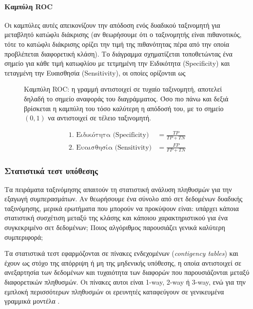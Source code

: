 \paragraph{Καμπύλη ROC} Οι καμπύλες αυτές απεικονίζουν την απόδοση ενός δυαδικού ταξινομητή για μεταβλητό κατώφλι διάκρισης (αν θεωρήσουμε ότι ο ταξινομητής είναι πιθανοτικός, τότε το κατώφλι διάκρισης ορίζει την τιμή της πιθανότητας πέρα από την οποία προβλέπεται διαφορετική κλάση). Το διάγραμμα σχηματίζεται τοποθετώντας ένα σημείο για κάθε τιμή κατωφλίου με τετμημένη την Ειδικότητα (Specificity) και τεταγμένη την Ευαισθησία (Sensitivity), οι οποίες ορίζονται ως

\begin{figure}[!htb]
	\centering
	\scalebox{0.5}{
     }
     \caption[Καμπύλη ROC Δυαδικού Ταξινομητή]{Καμπύλη ROC: η γραμμή αντιστοιχεί σε τυχαίο ταξινομητή, αποτελεί δηλαδή το σημείο αναφοράς του διαγράμματος. Όσο πιο πάνω και δεξιά βρίσκεται η καμπύλη του τόσο καλύτερη η απόδοσή του, με το σημείο $(0,1)$ να αντιστοιχεί σε τέλειο ταξινομητή.}
\end{figure}

\begin{align*} 
\text{1. Ειδικότητα (Specificity)} &= \frac{TP}{T P + T N} \\ 	
\text{2. Ευαισθησία (Sensitivity)} &= \frac{FP}{FP + TN} 
\end{align*}

	 
\subsubsection{Στατιστικά τεστ υπόθεσης}Τα πειράματα ταξινόμησης απαιτούν τη στατιστική ανάλυση πληθυσμών για την εξαγωγή συμπερασμάτων. Αν θεωρήσουμε ένα σύνολο από σετ δεδομένων δυαδικής ταξινόμησης, μερικά ερωτήματα που μπορούν να προκύψουν είναι: υπάρχει κάποια στατιστική συσχέτιση μεταξύ της κλάσης και κάποιου χαρακτηριστικού για ένα συγκεκριμένο σετ δεδομένων; Ποιος αλγόριθμος παρουσιάζει γενικά καλύτερη συμπεριφορά;

Τα στατιστικά τεστ εφαρμόζονται σε πίνακες ενδεχομένων (\textit{contigency tables}) και έχουν ως στόχο της απόρριψη ή μη της μηδενικής υπόθεσης, η οποία αντιστοιχεί σε ανεξαρτησία των δεδομένων και τυχαιότητα των διαφορών που παρουσιάζονται μεταξύ διαφορετικών πληθυσμών. Οι πίνακες αυτοι είναι 1-way, 2-way ή 3-way, ενώ για την εμπλοκή περισσότερων πληθυσμών οι ερευνητές καταφεύγουν σε γενικευμένα γραμμικά μοντέλα \citep{Introduction}.

